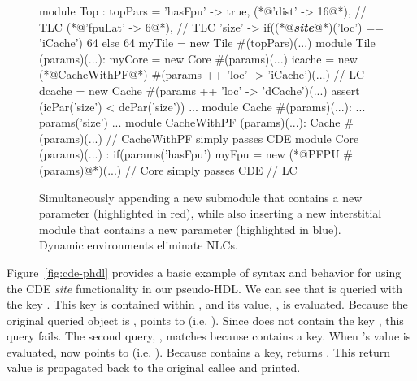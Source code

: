 \begin{figure}
\centering
\begin{phdl}
module Top :
  topPars = {'hasFpu' -> true,
             (*@\textcolor[rgb]{1,0,0}{'dist' -> 16}@*),                                   // TLC
             (*@\textcolor[rgb]{0,0,1}{'fpuLat' -> 6}@*),                                  // TLC
             'size' -> if((*@\textcolor[rgb]{1,0.5,0}{\textbf{\textit{site}}}@*)('loc') == 'iCache') 64 else 64 }
  myTile = new Tile #(topPars)(...)
module Tile (params)(...):
  myCore = new Core #(params)(...)
  icache = new (*@\textcolor[rgb]{1,0,0}{CacheWithPF}@*) #(params ++ {'loc' -> 'iCache'})(...) // LC
  dcache = new Cache #(params ++ {'loc' -> 'dCache'})(...)
  assert (icPar('size') < dcPar('size')) ...
module Cache #(params)(...):
  ... params('size') ...
module CacheWithPF (params)(...):
  Cache #(params)(...)        // CacheWithPF simply passes CDE
module Core (params)(...) :
  if(params('hasFpu') myFpu = new (*@\textcolor[rgb]{0,0,1}{PFPU \#(params)}@*)(...) // Core simply passes CDE  // LC
\end{phdl} 
\caption{Simultaneously appending a new submodule that contains a new parameter (highlighted in red), while also inserting
a new interstitial module that contains a new parameter (highlighted in blue). Dynamic environments eliminate NLCs.}
\label{fig:cde-delta}
\end{figure}

Figure~\ref{fig:cde-phdl} provides a basic example of syntax and behavior for using the CDE {\em site} functionality in our pseudo-HDL.
We can see that  is queried with the key . 
This key is contained within , and its value, , is evaluated. 
Because the original queried object is ,  points to  (i.e. ). 
Since  does not contain the key , this query fails.
The second query, , matches because  contains a  key. 
When 's value is evaluated,  now points to  (i.e. ). 
Because  contains a  key,  returns . 
This return value is propagated back to the original  callee and printed.

